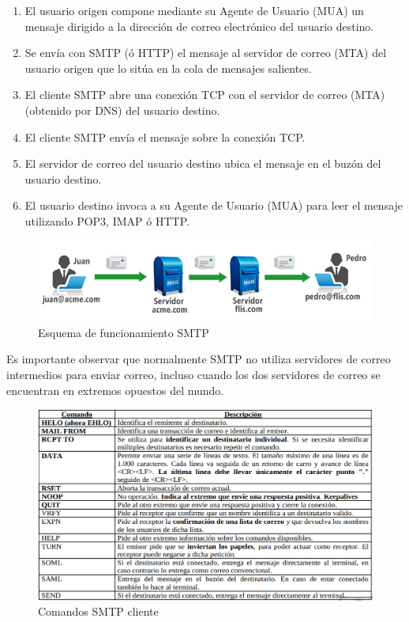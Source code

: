 \documentclass[a4paper,11pt]{article}
\begin{document}
\begin{enumerate}
\item El usuario origen compone mediante su Agente de Usuario (MUA) un mensaje dirigido a la dirección de correo electrónico del usuario destino.

\item Se envía con SMTP (ó HTTP) el mensaje al servidor de correo (MTA) del usuario origen que lo sitúa en la cola de mensajes salientes. 

\item El cliente SMTP abre una conexión TCP con el servidor de correo (MTA) (obtenido por DNS) del usuario destino. 

\item El cliente SMTP envía el mensaje sobre la conexión TCP.

\item El servidor de correo del usuario destino ubica el mensaje en el buzón del usuario destino.

\item El usuario destino invoca a su Agente de Usuario (MUA) para leer el mensaje utilizando POP3, IMAP ó HTTP.
\end{enumerate}

\begin{figure}
\centering
\caption{Esquema de funcionamiento SMTP}
\includegraphics[scale=1,width=1\textwidth]{envio-recepcion.jpg}
\end{figure}

Es importante observar que normalmente SMTP no utiliza servidores de correo intermedios para enviar correo, incluso cuando los dos servidores de correo se encuentran en extremos opuestos del mundo. \\

\begin{figure}[h]
\centering
\caption{Comandos SMTP cliente}
\includegraphics[scale=1,width=1.1\textwidth]{comando_smtp_cliente.png}
\end{figure}
\end{document}
